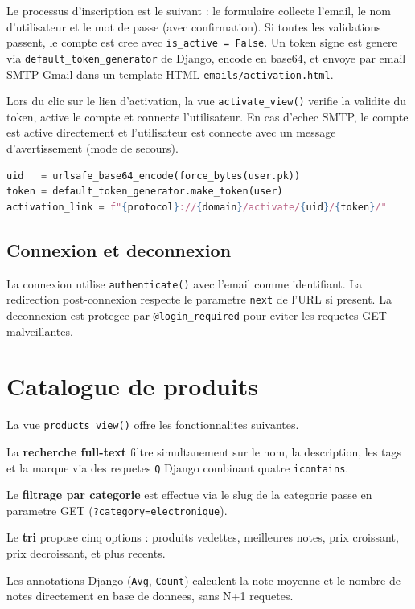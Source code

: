 \documentclass[12pt,a4paper]{report}
\newcommand{\fichier}[1]{\texttt{#1}}
\newcommand{\fonction}[1]{\texttt{#1()}}
\newcommand{\var}[1]{\texttt{#1}}
\begin{document}
Le processus d'inscription est le suivant : le formulaire collecte l'email,
le nom d'utilisateur et le mot de passe (avec confirmation). Si toutes les
validations passent, le compte est cree avec \var{is\_active = False}. Un token
signe est genere via \texttt{default\_token\_generator} de Django, encode en
base64, et envoye par email SMTP Gmail dans un template HTML
\fichier{emails/activation.html}.

Lors du clic sur le lien d'activation, la vue \fonction{activate\_view}
verifie la validite du token, active le compte et connecte l'utilisateur.
En cas d'echec SMTP, le compte est active directement et l'utilisateur est
connecte avec un message d'avertissement (mode de secours).

\begin{lstlisting}[language=Python,caption={Generation du lien d'activation}]
uid   = urlsafe_base64_encode(force_bytes(user.pk))
token = default_token_generator.make_token(user)
activation_link = f"{protocol}://{domain}/activate/{uid}/{token}/"
\end{lstlisting}

\subsection{Connexion et deconnexion}

La connexion utilise \texttt{authenticate()} avec l'email comme identifiant.
La redirection post-connexion respecte le parametre \var{next} de l'URL si
present. La deconnexion est protegee par \texttt{@login\_required} pour eviter
les requetes GET malveillantes.

\section{Catalogue de produits}

La vue \fonction{products\_view} offre les fonctionnalites suivantes.

La \textbf{recherche full-text} filtre simultanement sur le nom, la description,
les tags et la marque via des requetes \texttt{Q} Django combinant quatre
\texttt{icontains}.

Le \textbf{filtrage par categorie} est effectue via le slug de la categorie
passe en parametre GET (\var{?category=electronique}).

Le \textbf{tri} propose cinq options : produits vedettes, meilleures notes,
prix croissant, prix decroissant, et plus recents.

Les annotations Django (\texttt{Avg}, \texttt{Count}) calculent la note moyenne
et le nombre de notes directement en base de donnees, sans N+1 requetes.
\end{document}
